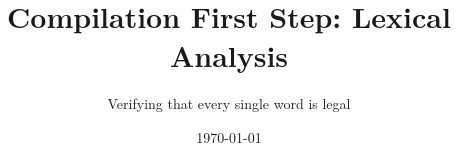 \documentclass{beamer}
\begin{document}
\title{Compilation First Step: Lexical Analysis}

\author{Verifying that every single word is legal}

\date{\today} 

\frame{\titlepage} 

















\end{document}
